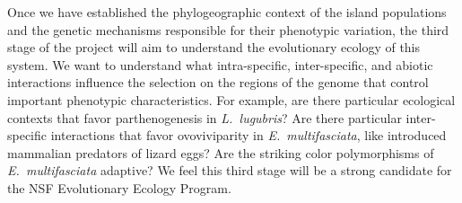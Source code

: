 Once we have established the phylogeographic context of the island populations
and the genetic mechanisms responsible for their phenotypic variation, the
third stage of the project will aim to understand the evolutionary ecology of
this system.
We want to understand what intra-specific, inter-specific, and abiotic
interactions influence the selection on the regions of the genome that control
important phenotypic characteristics.
For example, are there particular ecological contexts that favor
parthenogenesis in \emph{L.\ lugubris}?
Are there particular inter-specific interactions that favor ovoviviparity in
\emph{E.\ multifasciata}, like introduced mammalian predators of lizard eggs?
Are the striking color polymorphisms of \emph{E.\ multifasciata} adaptive?
We feel this third stage will be a strong candidate for the NSF Evolutionary
Ecology Program.


